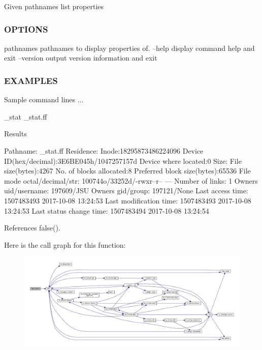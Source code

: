 Given pathnames list properties \subsubsection*{O\+P\+T\+I\+O\+NS}

pathnames pathnames to display properties of. --help display command help and exit --version output version information and exit \subsubsection*{E\+X\+A\+M\+P\+L\+ES}

Sample command lines ...

\+\_\+stat \+\_\+stat.\+ff

Results

Pathname\+: \+\_\+stat.\+ff Residence\+: Inode\+:18295873486224096 Device ID(hex/decimal)\+:3\+E6\+B\+E045h/1047257157d Device where located\+:0 Size\+: File size(bytes)\+:4267 No. of blocks allocated\+:8 Preferred block size(bytes)\+:65536 File mode octal/decimal/str\+: 100744o/33252d/-\/rwxr--r-- --- Number of links\+: 1 Owner\textquotesingle{}s uid/username\+: 197609/\+J\+SU Owner\textquotesingle{}s gid/group\+: 197121/\+None Last access time\+: 1507483493 2017-\/10-\/08 13\+:24\+:53 Last modification time\+: 1507483493 2017-\/10-\/08 13\+:24\+:53 Last status change time\+: 1507483494 2017-\/10-\/08 13\+:24\+:54 

References false().

Here is the call graph for this function\+:
\nopagebreak
\begin{figure}[H]
\begin{center}
\leavevmode
\includegraphics[width=350pt]{__stat_8f90_a39c21619b08a3c22f19e2306efd7f766_cgraph}
\end{center}
\end{figure}
\mbox{\label{__stat_8f90_a9ea6ab9cdaa05a5fc3ac6e5448b11c68}} 
